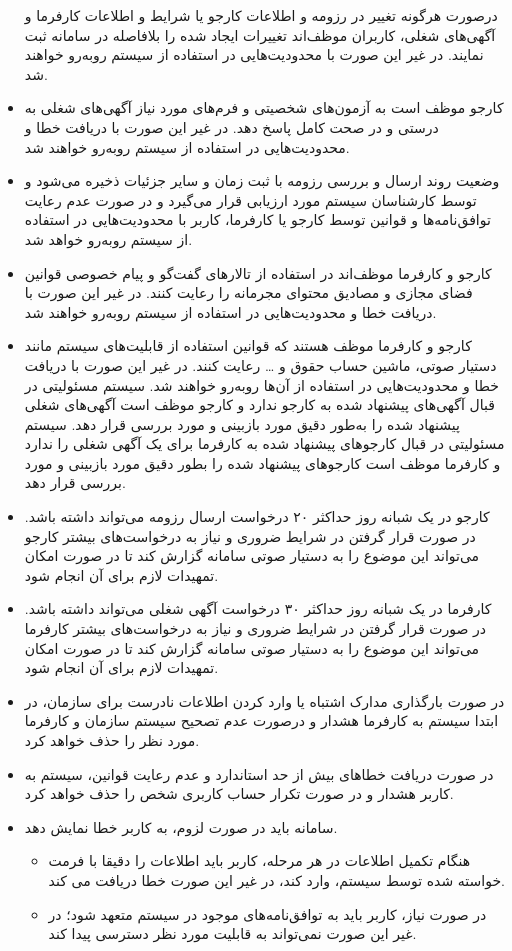 \documentclass[12pt]{article}
\begin{document}
\begin{itemize}
		در‌صورت هرگونه تغییر در رزومه و اطلاعات کارجو یا شرایط و اطلاعات کارفرما و آگهی‌های شغلی، کاربران موظف‌اند تغییرات ایجاد شده را بلافاصله در سامانه ثبت نمایند. در غیر این صورت با محدودیت‌هایی در استفاده از سیستم روبه‌رو خواهند شد.
		\item
		کارجو موظف است به آزمون‌های شخصیتی و فرم‌های مورد نیاز آگهی‌های شغلی به درستی و در صحت کامل پاسخ دهد. در غیر این صورت با دریافت خطا و محدودیت‌هایی در استفاده از سیستم روبه‌رو خواهند شد.
		\item
		وضعیت روند ارسال و بررسی رزومه با ثبت زمان و سایر جزئیات ذخیره می‌شود و توسط کارشناسان سیستم مورد ارزیابی قرار می‌گیرد و در صورت عدم رعایت توافق‌نامه‌ها و قوانین توسط کارجو یا کارفرما، کاربر با محدودیت‌هایی در استفاده از سیستم روبه‌رو خواهد شد.
		\item
		کارجو و کارفرما موظف‌اند در استفاده از تالارهای گفت‌گو و پیام خصوصی قوانین فضای مجازی و مصادیق محتوای مجرمانه را رعایت کنند. در غیر این صورت با دریافت خطا و محدودیت‌هایی در استفاده از سیستم روبه‌‌رو خواهند شد.
		\item
		کارجو و کارفرما موظف هستند که قوانین استفاده از قابلیت‌های سیستم مانند دستیار صوتی، ماشین حساب حقوق و … رعایت کنند. در غیر این صورت با دریافت خطا و محدودیت‌هایی در استفاده از آن‌ها روبه‌رو خواهند شد.
		سیستم مسئولیتی در قبال آگهی‌های پیشنهاد شده به کارجو ندارد و کارجو موظف است آگهی‌های شغلی پیشنهاد شده را به‌طور دقیق مورد بازبینی و مورد بررسی قرار دهد.
		سیستم مسئولیتی در قبال کارجو‌های پیشنهاد شده به کارفرما برای یک آگهی شغلی را ندارد و کارفرما موظف است کارجو‌های پیشنهاد شده را بطور دقیق مورد بازبینی و مورد بررسی قرار دهد.
		\item
		کارجو در یک شبانه روز حداکثر ۲۰ درخواست ارسال رزومه می‌تواند داشته باشد. در‌ صورت قرار گرفتن در شرایط ضروری و نیاز به درخواست‌های بیشتر کارجو می‌تواند این موضوع را به دستیار صوتی سامانه گزارش کند تا در صورت امکان تمهیدات لازم برای آن انجام شود.
		\item
		کارفرما در یک شبانه روز حداکثر ۳۰ درخواست آگهی شغلی می‌تواند داشته باشد. در‌ صورت قرار گرفتن در شرایط ضروری و نیاز به درخواست‌های بیشتر کارفرما می‌تواند این موضوع را به دستیار صوتی سامانه گزارش کند تا در صورت امکان تمهیدات لازم برای آن انجام شود.
		\item
		در‌ صورت بارگذاری مدارک اشتباه یا وارد کردن اطلاعات نادرست برای سازمان، در ابتدا سیستم به کارفرما هشدار و درصورت عدم تصحیح سیستم سازمان و کارفرما مورد‌ نظر را حذف خواهد کرد.
		\item
		در صورت دریافت خطاهای بیش از حد استاندارد و عدم رعایت قوانین، سیستم به کاربر هشدار و در‌ صورت تکرار حساب کاربری شخص را حذف خواهد کرد.
		\item
		سامانه باید در صورت لزوم، به کاربر خطا نمایش دهد.
		\begin{itemize}
			\item
			هنگام تکمیل اطلاعات در هر مرحله، کاربر باید اطلاعات را دقیقا با فرمت خواسته شده توسط سیستم، وارد کند، در غیر این صورت خطا دریافت می کند.
			\item
			در صورت نیاز، کاربر باید به توافق‌نامه‌های موجود در سیستم متعهد شود؛ در غیر این صورت نمی‌تواند به قابلیت مورد نظر دسترسی پیدا کند.
		\end{itemize}
	\end{itemize}
\end{document}

